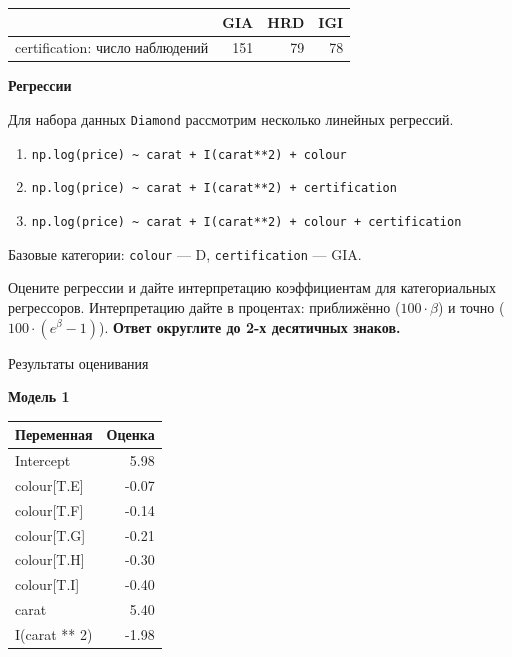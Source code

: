 \documentclass[
  russian,
]{article}
\newcounter{none} %
\providecommand{\tightlist}{%
  \setlength{\itemsep}{0pt}\setlength{\parskip}{0pt}}
\begin{document}
{\def\LTcaptype{none} %
\begin{longtable}[]{@{}lrrr@{}}
\toprule\noalign{}
& GIA & HRD & IGI \\
\midrule\noalign{}
\endhead
\bottomrule\noalign{}
\endlastfoot
certification: число наблюдений & 151 & 79 & 78 \\
\end{longtable}
}

\textbf{Регрессии}

Для набора данных \texttt{Diamond} рассмотрим несколько линейных
регрессий.

\begin{enumerate}
\def\labelenumi{\arabic{enumi}.}
\tightlist
\item
  \texttt{np.log(price)\ \textasciitilde{}\ carat\ +\ I(carat**2)\ +\ colour}
\item
  \texttt{np.log(price)\ \textasciitilde{}\ carat\ +\ I(carat**2)\ +\ certification}
\item
  \texttt{np.log(price)\ \textasciitilde{}\ carat\ +\ I(carat**2)\ +\ colour\ +\ certification}
\end{enumerate}

Базовые категории: \texttt{colour} --- D, \texttt{certification} ---
GIA.

Оцените регрессии и дайте интерпретацию коэффициентам для категориальных
регрессоров. Интерпретацию дайте в процентах: приближённо
(\(100\cdot\beta\)) и точно (\(100\cdot(e^{\beta}-1)\)). \textbf{Ответ
округлите до 2-х десятичных знаков.}

Результаты оценивания

\textbf{Модель 1}

{\def\LTcaptype{none} %
\begin{longtable}[]{@{}lr@{}}
\toprule\noalign{}
Переменная & Оценка \\
\midrule\noalign{}
\endhead
\bottomrule\noalign{}
\endlastfoot
Intercept & 5.98 \\
colour{[}T.E{]} & -0.07 \\
colour{[}T.F{]} & -0.14 \\
colour{[}T.G{]} & -0.21 \\
colour{[}T.H{]} & -0.30 \\
colour{[}T.I{]} & -0.40 \\
carat & 5.40 \\
I(carat ** 2) & -1.98 \\
\end{longtable}
}
\end{document}
